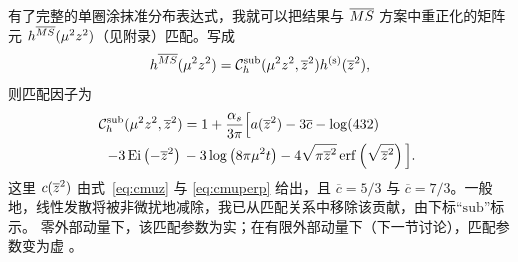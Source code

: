 有了完整的单圈涂抹准分布表达式，我就可以把结果与 $\overline{MS}$ 方案中重正化的矩阵元 $h^{\overline{MS}}(\mu^2z^2)$（见附录）匹配。写成
\begin{equation}
h^{\overline{MS}}(\mu^2z^2) = {\cal C}_h^{\mathrm{sub}}(\mu^2z^2,\overline{z}^2)h^{(\mathrm{s})}(\overline{z}^2),
\end{equation}
则匹配因子为
\begin{align}
\!\!{\cal C}_h^{\mathrm{sub}}(\mu^2z^2,\overline{z}^2){} &  = 1 +\frac{\alpha_s}{3\pi}\Big[a(\overline{z}^2)-3\overline{c} -\log(432)\nonumber\\
 - 3\operatorname{Ei}\left(-\overline{z}^2\right) {} & -3\log\left(8\pi\mu^2t\right) -4\sqrt{\pi\overline{z}^2}\operatorname{erf}\left(\sqrt{\overline{z}^2}\right)\Big].
\end{align}
这里 $c(\overline{z}^2)$ 由式~\eqref{eq:cmuz} 与 \eqref{eq:cmuperp} 给出，且 $\overline{c} =5/3$ 与 $\overline{c} =7/3$。一般地，线性发散将被非微扰地减除，我已从匹配关系中移除该贡献，由下标``$\mathrm{sub}$''标示。
零外部动量下，该匹配参数为实；在有限外部动量下（下一节讨论），匹配参数变为虚 \cite{Constantinou:2017sej}。
